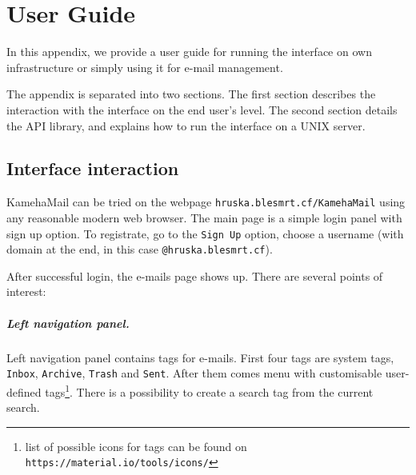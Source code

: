 \chapter{User Guide}
\label{userguide}
In this appendix, we provide a user guide for running the interface on own infrastructure or simply using it for e-mail management.

The appendix is separated into two sections. The first section describes the interaction with the interface on the end user's level. The second section details the API library, and explains how to run the interface on a UNIX server.

\section{Interface interaction}
KamehaMail can be tried on the webpage \texttt{hruska.blesmrt.cf/KamehaMail} using any reasonable modern web browser. The main page is a simple login panel with sign up option. To registrate, go to the \texttt{Sign Up} option, choose a username (with domain at the end, in this case \texttt{@hruska.blesmrt.cf}).

After successful login, the e-mails page shows up. There are several points of interest:

\paragraph{Left navigation panel.}
Left navigation panel contains tags for e-mails. First four tags are system tags, \texttt{Inbox}, \texttt{Archive}, \texttt{Trash} and \texttt{Sent}. After them comes menu with customisable user-defined tags\footnote{list of possible icons for tags can be found on \texttt{https://material.io/tools/icons/}}. There is a possibility to create a search tag from the current search.

